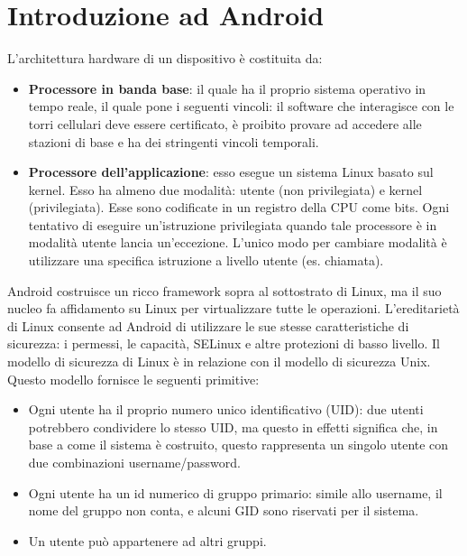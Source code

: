 \chapter{Introduzione ad Android}
L'architettura hardware di un dispositivo è costituita da:
\begin{itemize}
    \item \textbf{Processore in banda base}: il quale ha il proprio sistema operativo in tempo reale, il quale pone i seguenti vincoli: il software che interagisce con le torri cellulari deve essere certificato, è proibito provare ad accedere alle stazioni di base e ha dei stringenti vincoli temporali.
    \item \textbf{Processore dell'applicazione}: esso esegue un sistema Linux basato sul kernel. Esso ha almeno due modalità: utente (non privilegiata) e kernel (privilegiata). Esse sono codificate in un registro della CPU come bits. Ogni tentativo di eseguire un'istruzione privilegiata quando tale processore è in modalità utente lancia un'eccezione. L'unico modo per cambiare modalità è utilizzare una specifica istruzione a livello utente (es. chiamata).
\end{itemize}

Android costruisce un ricco framework sopra al sottostrato di Linux, ma il suo nucleo fa affidamento su Linux per virtualizzare tutte le operazioni. L'ereditarietà di Linux consente ad Android di utilizzare le sue stesse caratteristiche di sicurezza: i permessi, le capacità, SELinux e altre protezioni di basso livello. Il modello di sicurezza di Linux è in relazione con il modello di sicurezza Unix. Questo modello fornisce le seguenti primitive:
\begin{itemize}
    \item Ogni utente ha il proprio numero unico identificativo (UID): due utenti potrebbero condividere lo stesso UID, ma questo in effetti significa che, in base a come il sistema è costruito, questo rappresenta un singolo utente con due combinazioni username/password.
    \item Ogni utente ha un id numerico di gruppo primario: simile allo username, il nome del gruppo non conta, e alcuni GID sono riservati per il sistema.
    \item Un utente può appartenere ad altri gruppi.
\end{itemize}

